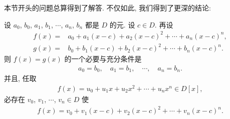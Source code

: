 本节开头的问题总算得到了解答. 不仅如此, 我们得到了更深的结论:

\begin{proposition}
    设 $a_0$, $b_0$, $a_1$, $b_1$, $\cdots$, $a_n$, $b_n$ 都是 $D$ 的元. 设 $c \in D$. 再设
    \begin{align*}
        f(x) = {} & a_0 + a_1 (x - c) + a_2 (x - c)^2 + \cdots + a_n (x - c)^n, \\
        g(x) = {} & b_0 + b_1 (x - c) + b_2 (x - c)^2 + \cdots + b_n (x - c)^n.
    \end{align*}
    则 $f(x)=g(x)$ 的一个必要与充分条件是
    \begin{align*}
        a_0 = b_0, \quad a_1 = b_1, \quad \cdots, \quad a_n = b_n.
    \end{align*}
    并且, 任取
    \begin{align*}
        f(x) = u_0 + u_1 x + u_2 x^2 + \cdots + u_n x^n \in D[x],
    \end{align*}
    必存在 $v_0$, $v_1$, $\cdots$, $v_n \in D$ 使
    \begin{align*}
        f(x) = v_0 + v_1 (x - c) + v_2 (x - c)^2 + \cdots + v_n (x - c)^n.
    \end{align*}
\end{proposition}
